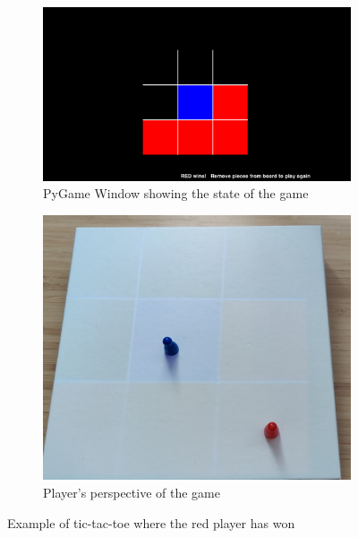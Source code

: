 \documentclass[12pt]{article}
\begin{document}
\begin{figure}[H]
    \centering
    \begin{subfigure}{0.65\textwidth}
        \includegraphics[width=1\textwidth]{images/figures/fig16a}
        \caption{PyGame Window showing the state of the game}
        \label{fig:tictactoea}
    \end{subfigure}
    \begin{subfigure}{0.65\textwidth}
        \includegraphics[width=1\textwidth]{images/figures/fig16b}
        \caption{Player's perspective of the game}
        \label{fig:tictactoeb}
    \end{subfigure}
    \caption{Example of tic-tac-toe where the red player has won}
    \label{fig:tictactoe}
\end{figure}
\end{document}
